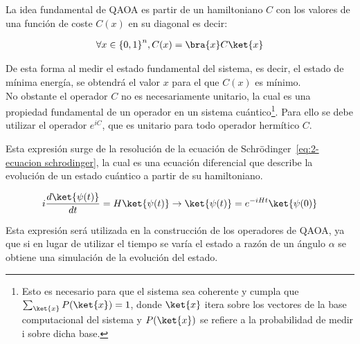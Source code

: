 
La idea fundamental de QAOA es partir de un hamiltoniano $C$ con los valores de una función de coste $C(x)$ en su diagonal es decir:

\begin{align*}
  \forall{x \in {\{0, 1\}}^{n}}, C(x) = \bra{x}C\ket{x}
\end{align*}

De esta forma al medir el estado fundamental del sistema, es decir, el estado de mínima energía,   %
se obtendrá el valor $x$ para el que $C(x)$ es mínimo.
\\
No obstante el operador $C$ no es necesariamente unitario, la cual es una propiedad fundamental de un operador en un sistema cuántico\footnote{
  Esto es necesario para que el sistema sea coherente y cumpla que $\sum_{\ket{x}} {P(\ket{x})} = 1$,
  donde $\ket{x}$ itera sobre los vectores de la base computacional del sistema y \(P(\ket{x})\) se refiere a la probabilidad de medir i sobre dicha base.}.
Para ello se debe utilizar el operador $e^{iC}$, que es unitario para todo operador hermítico $C$.

Esta expresión surge de la resolución de la ecuación de Schrödinger~\ref{eq:2-ecuacion schrodinger}, la cual es una ecuación diferencial que describe la evolución de un estado cuántico a partir de su hamiltoniano.

\begin{align}\label{eq:2-ecuacion schrodinger}
  i \frac{d\ket{\psi(t)}}{dt} = H \ket{\psi(t)} \rightarrow \ket{\psi(t)} = e^{-i H t}\ket{\psi(0)}
\end{align}

Esta expresión será utilizada en la construcción de los operadores de QAOA, ya que si en lugar de utilizar el tiempo se varía el estado a razón de un ángulo $\alpha$ se obtiene una simulación de la evolución del estado.

